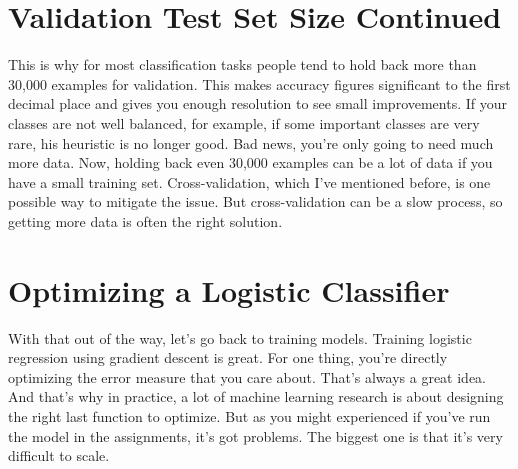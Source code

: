 \documentclass{article}
\begin{document}
\section{Validation Test Set Size Continued}
This is why for
most classification tasks
people tend to hold back more than
30,000 examples for validation.
This makes accuracy figures significant
to the first decimal place and
gives you enough resolution
to see small improvements.
If your classes are not well balanced,
for example,
if some important classes are very rare,
his heuristic is no longer good.
Bad news, you're only going
to need much more data.
Now, holding back even 30,000 examples
can be a lot of data if you have
a small training set.
Cross-validation, which
I've mentioned before,
is one possible way to
mitigate the issue.
But cross-validation
can be a slow process,
so getting more data is
often the right solution.
\section{Optimizing a Logistic Classifier}
With that out of the way,
let's go back to training models.
Training logistic regression
using gradient descent is great.
For one thing,
you're directly optimizing the error
measure that you care about.
That's always a great idea.
And that's why in practice,
a lot of machine learning research
is about designing the right
last function to optimize.
But as you might experienced if you've
run the model in the assignments,
it's got problems.
The biggest one is that it's
very difficult to scale.
\end{document}
